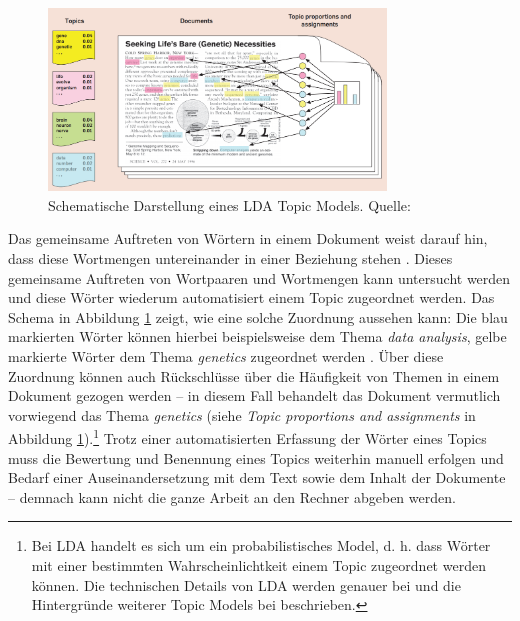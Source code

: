 \documentclass[12pt, 
    twoside=false, 
    bibliography=totoc, 
    numbers=endperiod, 
    headings=normal, 
    toc=chapterentrydotfill
    ]{scrbook}
\begin{document}
\begin{figure}
    \centering
    \includegraphics[width=0.8\textwidth]{document/images/lda_topic_model.png}
    \caption[Schematische Darstellung eines LDA Topic Models]{Schematische Darstellung eines LDA Topic Models. Quelle:  \parencite{blei_2012}}
    \label{fig:lda_example}
\end{figure}

Das gemeinsame Auftreten von Wörtern in einem Dokument weist darauf hin, dass diese Wortmengen untereinander in einer Beziehung stehen \parencite[90]{niekler_2018}. Dieses gemeinsame Auftreten von Wortpaaren und Wortmengen kann untersucht werden und diese Wörter wiederum automatisiert einem Topic zugeordnet werden. Das Schema in Abbildung \ref{fig:lda_example} zeigt, wie eine solche Zuordnung aussehen kann: Die blau markierten Wörter können hierbei beispielsweise dem Thema \emph{data analysis}, gelbe markierte Wörter dem Thema \emph{genetics} zugeordnet werden \parencite[vgl.][78]{blei_2012}. Über diese Zuordnung können auch Rückschlüsse über die Häufigkeit von Themen in einem Dokument gezogen werden -- in diesem Fall behandelt das Dokument vermutlich vorwiegend das Thema \emph{genetics} (siehe \emph{Topic proportions and assignments} in Abbildung \ref{fig:lda_example}).\footnote{Bei LDA handelt es sich um ein probabilistisches Model, d. h. dass Wörter mit einer bestimmten Wahrscheinlichtkeit einem Topic zugeordnet werden können. Die technischen Details von LDA werden genauer bei \textcite{blei_2012} und die Hintergründe weiterer Topic Models bei \textcite[87ff.]{niekler_2018} beschrieben.} Trotz einer automatisierten Erfassung der Wörter eines Topics muss die Bewertung und Benennung eines Topics weiterhin manuell erfolgen und Bedarf einer Auseinandersetzung mit dem Text sowie dem Inhalt der Dokumente -- demnach kann nicht die ganze Arbeit an den Rechner abgeben werden.
\end{document}
